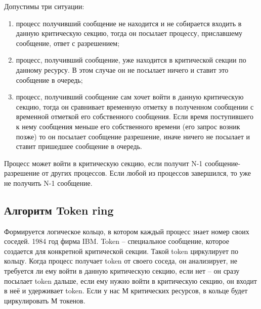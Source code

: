 Допустимы три ситуации:
\begin{enumerate}
    \item процесс получивший сообщение не находится и не собирается входить в данную критическую секцию, тогда он посылает процессу, приславшему сообщение, ответ с разрешением;
    \item процесс, получивший сообщение, уже находится в критической секции по данному ресурсу. В этом случае он не посылает ничего и ставит это сообщение в очередь;
    \item процесс, получивший сообщение сам хочет войти в данную критическую секцию, тогда он сравнивает временную отметку в полученном сообщении с временной отметкой его собственного сообщения. Если время поступившего к нему сообщения меньше его собственного времени (его запрос возник позже) то он посылает сообщение разрешение, иначе ничего не посылает и ставит пришедшее сообщение в очередь.
\end{enumerate} 

Процесс может войти в критическую секцию, если получит N-1 сообщение-разрешение от других процессов. Если любой из процессов завершился, то уже не получить N-1 сообщение.

\subsection{Алгоритм Token ring}

Формируется логическое кольцо, в котором каждый процесс знает номер своих соседей. 1984 год фирма IBM. Token – специальное сообщение, которое создается для конкретной критической секции. Такой token циркулирует по кольцу.  Когда процесс получает  token от своего соседа, он анализирует, не требуется ли ему войти в данную критическую секцию, если нет – он сразу посылает token дальше, если ему нужно войти в критическую секцию, он входит в неё и удерживает  token. Если у нас М критических ресурсов, в кольце будет циркулировать М токенов.
